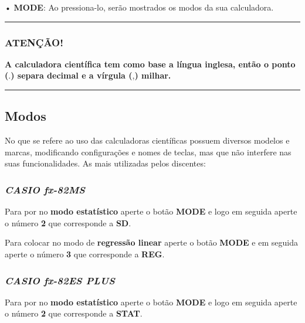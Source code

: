 \documentclass[]{book}
\begin{document}
• \textbf{MODE}: Ao pressiona-lo, serão mostrados os modos da sua calculadora.

\begin{center}\rule{0.5\linewidth}{\linethickness}\end{center}

\hypertarget{atencao}{%
\subsubsection{\texorpdfstring{\textbf{ATENÇÃO!}}{ATENÇÃO!}}\label{atencao}}

\textbf{A calculadora científica tem como base a língua inglesa, então o ponto (}.\textbf{) separa decimal e a vírgula (},\textbf{) milhar.}

\begin{center}\rule{0.5\linewidth}{\linethickness}\end{center}

\hypertarget{modos}{%
\subsection{Modos}\label{modos}}

No que se refere ao uso das calculadoras científicas possuem diversos modelos e marcas, modificando configurações e nomes de teclas, mas que não interfere nas suas funcionalidades. As mais utilizadas pelos discentes:

\hypertarget{casio-fx-82ms}{%
\subsubsection{\texorpdfstring{\textbf{\emph{CASIO fx-82MS}}}{CASIO fx-82MS}}\label{casio-fx-82ms}}

Para por no \textbf{modo estatístico} aperte o botão \textbf{MODE} e logo em seguida aperte o número \textbf{2} que corresponde a \textbf{SD}.

Para colocar no modo de \textbf{regressão linear} aperte o botão \textbf{MODE} e em seguida aperte o número \textbf{3} que corresponde a \textbf{REG}.

\hypertarget{casio-fx-82es-plus}{%
\subsubsection{\texorpdfstring{\textbf{\emph{CASIO fx-82ES PLUS}}}{CASIO fx-82ES PLUS}}\label{casio-fx-82es-plus}}

Para por no \textbf{modo estatístico} aperte o botão \textbf{MODE} e logo em seguida aperte o número \textbf{2} que corresponde a \textbf{STAT}.
\end{document}
